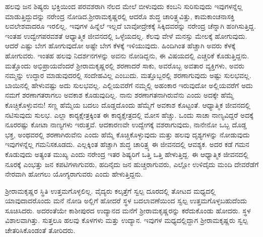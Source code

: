 ಹಲವು ಜನ ಶಿಷ್ಯರು ಭಕ್ತಿಯಿಂದ ಪರವಶರಾಗಿ ನೆಲದ ಮೇಲೆ ಬೀಳುವುದು ಕಂಬನಿ ಸುರಿಸುವುದು ಇವುಗಳನ್ನೆಲ್ಲ ಮಾಡುತ್ತಿದ್ದುದನ್ನು ನರೇಂದ್ರ ನೋಡಿದ.\break ಶ‍್ರೀರಾಮಕೃಷ್ಣರಲ್ಲಿ ಆದರೊ ಶುದ್ಧ ಚಾರಿತ್ರ್ಯವಿತ್ತು, ಕಾಮಕಾಂಚನಾಸಕ್ತಿ ಲವಲೇಶವಾದರೂ ಇರಲಿಲ್ಲ. ಇವುಗಳ ಹಿನ್ನೆಲೆ ಇಲ್ಲದೆ ಬಾವೋದ್ರೇಕಕ್ಕೆ ಸಿಕ್ಕಿದವರನ್ನು ನರೇಂದ್ರ ಚೆನ್ನಾಗಿ ಹಂಗಿಸುತ್ತಿದ್ದ. ಇಂತಹ ಉದ್ವೇಗಪರವಶತೆ ಆಧ್ಯಾತ್ಮಿಕ ಜೀವನದಲ್ಲಿ ಒಳ್ಳೆಯದಲ್ಲ. ಕೆಲವು ವೇಳೆ ಮನಸ್ಸು ಮೇಲಕ್ಕೆ ಹೋಗುವುದು. ಆದರೆ ಎಷ್ಟು ಬೇಗ ಹೋಗುವುದೋ ಅಷ್ಟೇ ಬೇಗ ಕೆಳಕ್ಕೆ ಇಳಿಯುವುದು. ಹಿಂದಿಗಿಂತ ಹೆಚ್ಚಾಗಿ ಅವರು ಕೆಳಕ್ಕೆ ಹೋಗುವರು. ಇಂತಹ ಹಲವು ನಿದರ್ಶನಗಳನ್ನು ಅವನು ನೋಡಿದ್ದನು, ಈ ವಿಷಯದಲ್ಲಿ ಎಚ್ಚರಿಕೆ ಕೊಡುತ್ತಿದ್ದನು. ಮತ್ತೊಂದು ಅಭಿಪ್ರಾಯವೆಂದರೆ ಶ‍್ರೀರಾಮಕೃಷ್ಣರಲ್ಲಿ ಶರಣಾದರೆ ಸಾಕು, ಅವರೊಬ್ಬ ಅವತಾರ ವ್ಯಕ್ತಿಗಳು, ಅವರು ನಮ್ಮನ್ನು ಉದ್ಧಾರ ಮಾಡುವುದರಲ್ಲಿ ಸಂದೇಹವಿಲ್ಲ ಎಂಬುದು. ಮತ್ತೊಬ್ಬರಲ್ಲಿ ಶರಣಾಗುವುದು ಅಷ್ಟು ಸುಲಭವಲ್ಲ. ಬಾಯಿನಲ್ಲಿ ಹೇಳುವಷ್ಟು ಅದು ಸುಲಭವಲ್ಲ. ಎಲ್ಲಿಯವರೆಗೆ ನಮ್ಮಲ್ಲಿ ಅಹಂಕಾರ ಇರುವುದೋ ಅಲ್ಲಿಯವರೆಗೆ ಅದು ನಮಗೆ ಶರಣಾಗತರಾಗಲು ಅವಕಾಶ ಕೊಡುವುದಿಲ್ಲ. ನಾನು ಶರಣಾಗತನಾಗಿರುವೆನು ಎಂದು ಅದಕ್ಕೇ ಹೆಮ್ಮೆ ಕೊಚ್ಚಿಕೊಳ್ಳುವನು! ಸಣ್ಣ ಹೆಮ್ಮೆಯ ಬದಲು ದೊಡ್ಡದೊಂದು ಹೆಮ್ಮೆಗೆ ಅವಕಾಶ ಕೊಟ್ಟಂತೆ. ಆಧ್ಯಾತ್ಮಿಕ ಜೀವನದಲ್ಲಿ ನಟಿಸುವುದು ಸುಲಭ. ಎಲ್ಲಾ ಕಾರ‍್ಯಕ್ಷೇತ್ರಕ್ಕಿಂತ ಈ ಕಾರ‍್ಯಕ್ಷೇತ್ರದಲ್ಲಿ ಮೋಸ ಹೆಚ್ಚು. ಒಂದು ಸಾಚಾ ನಾಣ್ಯವಿದ್ದರೆ ಅದಕ್ಕೆ ನೂರರಷ್ಟು ಕೋಟಾ ನಾಣ್ಯಗಳು ಇರುತ್ತವೆ. ಆದಕಾರಣವೇ ಉದ್ವೇಗಕ್ಕೆ ವಶರಾಗುವುದು, ನಾನೇನೋ ಒಬ್ಬ ದೊಡ್ಡ ಭಕ್ತ, ಅಂಥವರಲ್ಲಿ ಶರಣಾಗಿರುವೆನು ಎಂದು ಹೆಮ್ಮೆ ಕೊಚ್ಚಿಕೊಳ್ಳುವುದು ಮತ್ತು ಹಲವು ದೃಶ್ಯಗಳನ್ನು ನೋಡುವುದು ಇವುಗಳನ್ನೆಲ್ಲ ಗಮನಿಸಕೂಡದು. ಎಲ್ಲಕ್ಕಿಂತ ಹೆಚ್ಚಾಗಿ ಶುದ್ಧ ಚಾರಿತ್ರ್ಯ ಈ ಜೀವನದಲ್ಲಿ ಆವಶ್ಯಕ. ಅದರ ಕಡೆ ಗಮನ ಕೊಡುವುದು ಅತ್ಯಂತ ಮುಖ್ಯ ಎಂದು ನರೇಂದ್ರ ಇತರ ಶಿಷ್ಯರಿಗೆ ಒತ್ತಿ ಒತ್ತಿ ಹೇಳುತ್ತಿದ್ದ. ಈ ಆಧ್ಯಾತ್ಮಿಕ ಜೀವನದಲ್ಲಿ ನೂರಕ್ಕೆ ಎಂಭತ್ತು ಜನ ಕಪಟಿಗಳಾಗುವರು, ಹದಿನೈದು ಜನ ಹುಚ್ಚರಾಗುವರು, ಎಲ್ಲೋ ಉಳಿದೈದು ಮಂದಿ ದೇವರೆಡೆಗೆ ನೇರವಾಗಿ ಹೋಗಲು ಯೋಗ್ಯರಾಗುವರು ಎಂದು ಹೇಳುತ್ತಿದ್ದನು.

ಶ‍್ರೀರಾಮಕೃಷ್ಣರ ಸ್ಥಿತಿ ಉತ್ತಮಗೊಳ್ಳಲಿಲ್ಲ. ವೈದ್ಯರು ಕಲ್ಕತ್ತೆಗೆ ಸ್ವಲ್ಪ ದೂರದಲ್ಲಿ ತೋಟದ ಮಧ್ಯದಲ್ಲಿ ಯಾವುದಾದರೊಂದು ಮನೆ ನೋಡಿ ಅಲ್ಲಿಗೆ ಹೋದರೆ ಸ್ಥಳ ಬದಲಾವಣೆಯಿಂದ ಸ್ವಲ್ಪ ಉತ್ತಮಗೊಳ್ಳಬಹುದೆಂದು ಸೂಚಿಸಿದರು. ಅದರಂತೆಯೇ ಕಾಶೀಪುರದ ಉದ್ಯಾನದ ಮನೆಗೆ ಶ‍್ರೀರಾಮಕೃಷ್ಣರನ್ನು ಕರೆದುಕೊಂಡು ಹೋದರು. ಸ್ಥಳ ವಿಶಾಲವಾಗಿತ್ತು. ಸುತ್ತಲೂ ಹಲವು ಕೊಳಗಳು ಮತ್ತು ಉದ್ಯಾನ. ಇವುಗಳ ಮಧ್ಯದಲ್ಲಿದ್ದಾಗ ಶ‍್ರೀರಾಮಕೃಷ್ಣರು ಸ್ವಲ್ಪ ಚೇತರಿಸಿಕೊಂಡಂತೆ ತೋರಿದರು.

